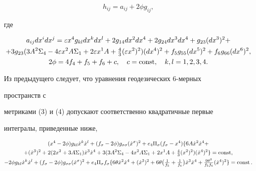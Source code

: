 \begin{equation} 


h_{ij}=a_{ij}+2\phi g_{ij}, 


\end{equation} 


где 


\begin{gather} 


a_{ij}dx^i dx^j=\varepsilon x^4 g_{kl}dx^k dx^l+ 


2g_{14}dx^2dx^4+2g_{24}dx^3dx^4+g_{23}(dx^3)^2+\notag \\ 


+3g_{23}(3A^2\Sigma_4-4\varepsilon x^2A\Sigma_1+ 


2\varepsilon x^1A+\tfrac{4}{3}(\varepsilon x^2)^2) 


(dx^4)^2+f_5g_{55}(dx^5)^2+f_6g_{66}(dx^6)^2,\\ 


2\phi=4f_4+f_5+f_6+c,\quad c=\const,\quad k,l=1,2,3,4. 


\end{gather} 


Из предыдущего следует, что уравнения геодезических 6-мерных 


пространств с 


метриками (3) и (4) допускают соответственно квадратичные первые 


интегралы, приведенные ниже,


\begin{gather} 


(x^4-2\phi)g_{kl}\Dot x^k\Dot x^l+(f_\sigma-2\phi) 


g_{\sigma\sigma}(\Dot x^\sigma)^2+e_4\Pi_\sigma 


(f_\sigma-x^4)\{6A\Dot x^2\Dot x^4 +\notag\\ 


%


+(\Dot x^3)^2+2(2x^2+3A\Sigma_1)\Dot x^3\Dot x^4+ 


3(3A^2\Sigma_4-4x^2A\Sigma_1+2x^1A+\tfrac{4}{3}(x^2)^2) 


(\Dot x^4)^2\}=\const,\\ 


-2\phi g_{kl}\Dot x^k\Dot x^l+(f_\sigma-2\phi) 


g_{\sigma\sigma}(\Dot x^\sigma)^2+e_4\Pi_\sigma 


f_\sigma\{6\theta\Dot x^2\Dot x^4+


(\Dot x^3)^2+6\theta\big(\tfrac{1}{f_5}+\tfrac{1}{f_6}\big) 


\Dot x^3\Dot x^4+\tfrac{9\theta^2}{f_5f_6} 


(\Dot x^4)^2\}=\const. 


\end{gather} 


